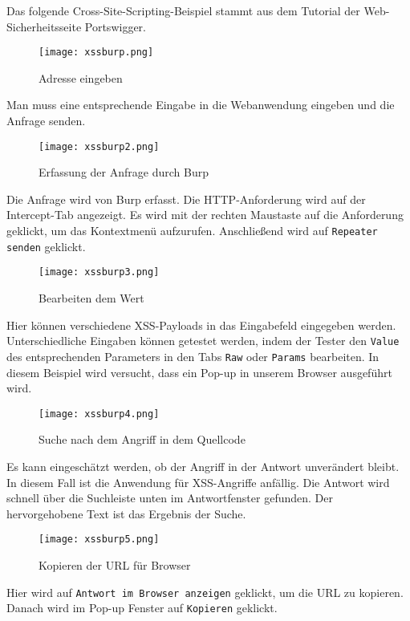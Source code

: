 Das folgende Cross-Site-Scripting-Beispiel stammt aus dem Tutorial der Web-Sicherheitsseite Portswigger\cite{portswigger12}.

\begin{figure}[h]
	\centering
	\texttt{[image: xssburp.png]}
	\caption{Adresse eingeben}
\end{figure}

\newpage

Man muss eine entsprechende Eingabe in die Webanwendung eingeben und die Anfrage senden.

\begin{figure}[h]
	\centering
	\texttt{[image: xssburp2.png]}
	\caption{Erfassung der Anfrage durch Burp}
\end{figure}

Die Anfrage wird von Burp erfasst. Die HTTP-Anforderung wird auf der Intercept-Tab angezeigt. Es wird mit der rechten Maustaste auf die Anforderung geklickt, um das Kontextmenü aufzurufen. Anschließend wird auf \texttt{Repeater senden} geklickt.

\begin{figure}[h]
	\centering
	\texttt{[image: xssburp3.png]}
	\caption{Bearbeiten dem Wert}
\end{figure}

Hier können verschiedene XSS-Payloads in das Eingabefeld eingegeben werden. Unterschiedliche Eingaben können getestet werden, indem der Tester den \texttt{Value} des entsprechenden Parameters in den Tabs \texttt{Raw} oder \texttt{Params} bearbeiten. In diesem Beispiel wird versucht, dass ein Pop-up in unserem Browser ausgeführt wird.

\begin{figure}[h]
	\centering
	\texttt{[image: xssburp4.png]}
	\caption{Suche nach dem Angriff in dem Quellcode}
\end{figure}

Es kann eingeschätzt werden, ob der Angriff in der Antwort unverändert bleibt. In diesem Fall ist die Anwendung für XSS-Angriffe anfällig. Die Antwort wird schnell über die Suchleiste unten im Antwortfenster gefunden. Der hervorgehobene Text ist das Ergebnis der Suche.

\begin{figure}[h]
	\centering
	\texttt{[image: xssburp5.png]}
	\caption{Kopieren der URL für Browser}
\end{figure}

Hier wird auf \texttt{Antwort im Browser anzeigen} geklickt, um die URL zu kopieren. Danach wird im Pop-up Fenster auf \texttt{Kopieren} geklickt.

